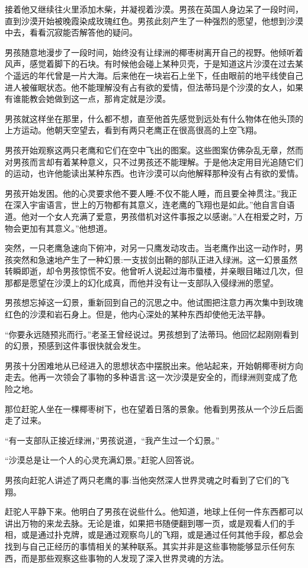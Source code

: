 \documentclass[twoside,openany]{book}
\begin{document}
接着他又继续往火里添加木柴，并凝视着沙漠。男孩在英国人身边呆了一段时间，直到沙漠开始被晚霞染成玫瑰红色。男孩此刻产生了一种强烈的愿望，他想到沙漠中去，看看沉寂能否解答他的疑问。

男孩随意地漫步了一段时间，始终没有让绿洲的椰枣树离开自己的视野。他倾听着风声，感觉着脚下的石块。有时候他会碰上某种贝壳，于是知道这片沙漠在过去某个遥远的年代曾是一片大海。后来他在一块岩石上坐下，任由眼前的地平线使自己进人被催眠状态。他不能理解没有占有欲的爱情，但法蒂玛是个沙漠的女人，如果有谁能教会她做到这一点，那肯定就是沙漠。

男孩就这样坐在那里，什么都不想，直至他首先感觉到远处有什么物体在他头顶的上方运动。他朝天空望去，看到有两只老鹰正在很高很高的上空飞翔。

男孩开始观察这两只老鹰和它们在空中飞出的图案。这些图案仿佛杂乱无章，然而对男孩而言却有着某种意义，只不过男孩还不能理解。于是他决定用目光追随它们的运动，也许他能读出某种东西。也许沙漠可以向他解释那种没有占有欲的爱情。

男孩开始发困。他的心灵要求他不要人睡:不仅不能人睡，而且要全神贯注。”我正在深入宇宙语言，世上的万物都有其意义，连老鹰的飞翔也是如此。”他自言自语道。他对一个女人充满了爱意，男孩借机对这件事报之以感谢。”人在相爱之时，万物会更加有其意义。”他想道。

突然，一只老鹰急速向下俯冲，对另一只鹰发动攻击。当老鹰作出这一动作时，男孩突然和急速地产生了一种幻景:一支拔剑出鞘的部队正进入绿洲。这一幻景虽然转瞬即逝，却令男孩惊慌不安。他曾听人说起过海市蜃楼，并亲眼目睹过几次，但那都是愿望在沙漠上的幻化成真，而他并没有让一支部队入侵绿洲的愿望。

男孩想忘掉这一幻景，重新回到自己的沉思之中。他试图把注意力再次集中到玫瑰红色的沙漠和岩石身上。但是，他内心深处的某种东西却使他无法平静。

“你要永远随预兆而行。”老圣王曾经说过。男孩想到了法蒂玛。他回忆起刚刚看到的幻景，预感到这件事很快就会发生。

男孩十分困难地从已经进入的思想状态中摆脱出来。他站起来，开始朝椰枣树方向走去。他再一次领会了事物的多种语言:这一次沙漠是安全的，而绿洲则变成了危险之地。

那位赶驼人坐在一棵椰枣树下，也在望着日落的景象。他看到男孩从一个沙丘后面走了过来。

“有一支部队正接近绿洲，”男孩说道，“我产生过一个幻景。”

“沙漠总是让一个人的心灵充满幻景。”赶驼人回答说。

男孩向赶驼人讲述了两只老鹰的事:当他突然深人世界灵魂之时看到了它们的飞翔。

赶驼人平静下来。他明白了男孩在说些什么。他知道，地球上任何一件东西都可以讲出万物的来龙去脉。无论是谁，如果把书随便翻到哪一页，或是观看人们的手相，或是通过扑克牌，或是通过观察鸟儿的飞翔，或是通过任何其他手段，都总会找到与自己正经历的事情相关的某种联系。其实并非是这些事物能够显示任何东西，而是那些观察这些事物的人发现了深入世界灵魂的方法。
\end{document}
